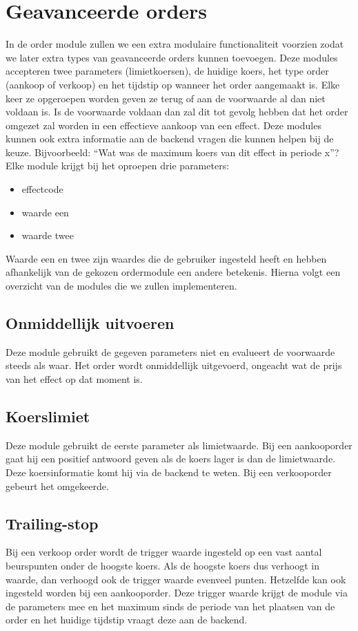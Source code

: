 %
%

\chapter{Geavanceerde orders}
\label{chap:geavanceerde_orders}

In de order module zullen we een extra modulaire functionaliteit voorzien zodat we later extra types van geavanceerde orders kunnen toevoegen.
Deze modules accepteren twee parameters (limietkoersen), de huidige koers, het type order (aankoop of verkoop) en het tijdstip op wanneer het order aangemaakt is. Elke keer ze opgeroepen worden geven ze terug of aan de voorwaarde al dan niet voldaan is. Is de voorwaarde voldaan dan zal dit tot gevolg hebben dat het order omgezet zal worden in een effectieve aankoop van een effect.
Deze modules kunnen ook extra informatie aan de backend vragen die kunnen helpen bij de keuze. Bijvoorbeeld: ``Wat was de maximum koers van dit effect in periode x''?
Elke module krijgt bij het oproepen drie parameters:
\begin{itemize}
\item{effectcode}
\item{waarde een}
\item{waarde twee}
\end{itemize}

Waarde een en twee zijn waardes die de gebruiker ingesteld heeft en hebben afhankelijk van de gekozen ordermodule een andere betekenis.
Hierna volgt een overzicht van de modules die we zullen implementeren.

\section{Onmiddellijk uitvoeren}
Deze module gebruikt de gegeven parameters niet en evalueert de voorwaarde steeds als waar. Het order wordt onmiddellijk uitgevoerd, ongeacht wat de prijs van het effect op dat moment is.

\section{Koerslimiet}
Deze module gebruikt de eerste parameter als limietwaarde. Bij een aankooporder gaat hij een positief antwoord geven als de koers lager is dan de limietwaarde. Deze koersinformatie komt hij via de backend te weten. Bij een verkooporder gebeurt het omgekeerde. 

\section{Trailing-stop}
Bij een verkoop order wordt de trigger waarde ingesteld op een vast aantal beurspunten onder de hoogste koers. Als de hoogste koers dus verhoogt in waarde, dan verhoogd ook de trigger waarde evenveel punten. Hetzelfde kan ook ingesteld worden bij een aankooporder. Deze trigger waarde krijgt de module via de parameters mee en het maximum sinds de periode van het plaatsen van de order en het huidige tijdstip vraagt deze aan de backend.

